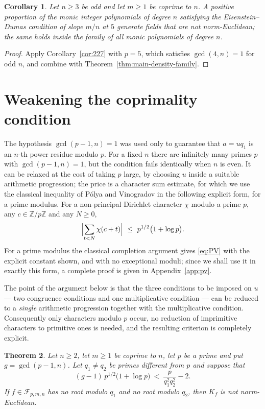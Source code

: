 \documentclass[11pt,reqno]{amsart}
\theoremstyle{plain}
\newtheorem{theorem}{Theorem}[section]
\newtheorem{corollary}[theorem]{Corollary}
\theoremstyle{definition}
\theoremstyle{remark}
\newcommand{\Z}{\mathbb{Z}}
\begin{document}
\begin{corollary}\label{cor:positive}
Let $n\ge3$ be odd and let $m\ge1$ be coprime to $n$. A positive proportion of the monic integer
polynomials of degree $n$ satisfying the Eisenstein--Dumas condition of slope $m/n$ at $5$
generate fields that are not norm-Euclidean; the same holds inside the family of all monic
polynomials of degree $n$.
\end{corollary}

\begin{proof}
Apply Corollary~\ref{cor:227} with $p=5$, which satisfies $\gcd(4,n)=1$ for odd $n$, and combine
with Theorem~\ref{thm:main-density-family}.
\end{proof}

\section{Weakening the coprimality condition}\label{sec:gcd}

The hypothesis $\gcd(p-1,n)=1$ was used only to guarantee that $a=uq_1$ is an $n$-th power residue
modulo $p$. For a fixed $n$ there are infinitely many primes $p$ with $\gcd(p-1,n)=1$, but the
condition fails identically when $n$ is even. It can be relaxed at the cost of taking $p$ large,
by choosing $u$ inside a suitable arithmetic progression; the price is a character sum estimate,
for which we use the classical inequality of P\'olya and Vinogradov \cite{Polya,Vinogradov} in the
following explicit form, for a prime modulus. For a non-principal Dirichlet character $\chi$
modulo a prime $p$, any $c\in\Z/p\Z$ and any $N\ge0$,
\begin{equation}\label{eq:PV}
  \Bigl|\sum_{t<N}\chi(c+t)\Bigr|\ \le\ p^{1/2}\bigl(1+\log p\bigr).
\end{equation}
For a prime modulus the classical completion argument gives \eqref{eq:PV} with the explicit
constant shown, and with no exceptional moduli; since we shall use it in exactly this form, a
complete proof is given in Appendix~\ref{app:pv}.

The point of the argument below is that the three conditions to be imposed on $u$ --- two
congruence conditions and one multiplicative condition --- can be reduced to a
\emph{single} arithmetic progression together with the multiplicative condition. Consequently only
characters modulo $p$ occur, no reduction of imprimitive characters to primitive ones is needed,
and the resulting criterion is completely explicit.

\begin{theorem}\label{thm:gcd}
Let $n\ge2$, let $m\ge1$ be coprime to $n$, let $p$ be a prime and put $g=\gcd(p-1,n)$. Let
$q_1\ne q_2$ be primes different from $p$ and suppose that
\begin{equation}\label{eq:gcd-condition}
  (g-1)\,p^{1/2}\bigl(1+\log p\bigr)\ <\ \frac{p}{q_1^{2}q_2^{2}}-2 .
\end{equation}
If $f\in\mathcal F_{p,m,n}$ has no root modulo $q_1$ and no root modulo $q_2$, then $K_f$ is not
norm-Euclidean.
\end{theorem}
\end{document}

